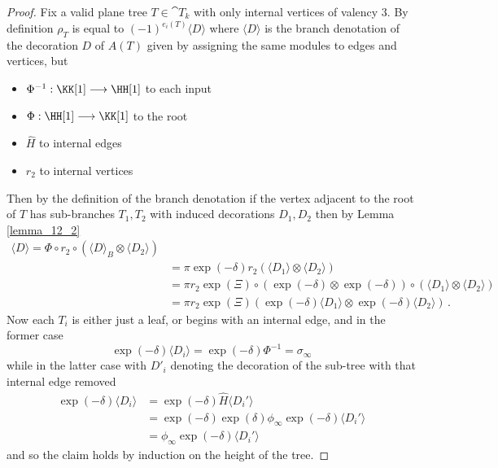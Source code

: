 \documentclass[english,letter paper,12pt,leqno]{article}
\theoremstyle{example}
\numberwithin{equation}{section}
\begin{document}
\begin{proof}
Fix a valid plane tree $T \in \cat{T}_k$ with only internal vertices of valency $3$. By definition $\rho_T$ is equal to $(-1)^{e_i(T)} \langle D \rangle$ where $\langle D \rangle$ is the branch denotation of the decoration $D$ of $A(T)$ given by assigning the same modules to edges and vertices, but
\begin{itemize}
\item $\Phi^{-1}: \KK[1] \lto \HH[1]$ to each input
\item $\Phi: \HH[1] \lto \KK[1]$ to the root
\item $\widehat{H}$ to internal edges
\item $r_2$ to internal vertices
\end{itemize}
Then by the definition of the branch denotation if the vertex adjacent to the root of $T$ has sub-branches $T_1,T_2$ with induced decorations $D_1,D_2$ then by Lemma \ref{lemma_12_2}
\begin{align*}
\langle D \rangle = \Phi \circ r_2 \circ ( \langle D \rangle_B \otimes \langle D_2 \rangle )\\
&= \pi \exp(-\delta) r_2( \langle D_1 \rangle \otimes \langle D_2 \rangle )\\
&= \pi r_2 \exp(\Xi) \circ ( \exp(-\delta) \otimes \exp(-\delta) ) \circ ( \langle D_1 \rangle \otimes \langle D_2 \rangle )\\
&= \pi r_2 \exp(\Xi)( \exp(-\delta) \langle D_1 \rangle \otimes \exp(-\delta) \langle D_2 \rangle )\,.
\end{align*}
Now each $T_i$ is either just a leaf, or begins with an internal edge, and in the former case
\[
\exp(-\delta) \langle D_i \rangle = \exp(-\delta) \Phi^{-1} = \sigma_\infty
\]
while in the latter case with $D'_i$ denoting the decoration of the sub-tree with that internal edge removed
\begin{align*}
\exp(-\delta) \langle D_i \rangle &= \exp(-\delta) \widehat{H} \langle D_i' \rangle\\
&= \exp(-\delta) \exp(\delta) \phi_\infty \exp(-\delta) \langle D_i' \rangle\\
&= \phi_\infty \exp(-\delta) \langle D_i' \rangle
\end{align*}
and so the claim holds by induction on the height of the tree.
\end{proof}
\end{document}
